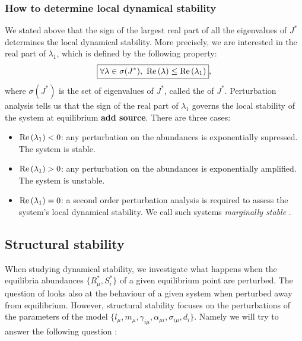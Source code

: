 \documentclass[12pt, titlepage]{report}
\begin{document}
\subsubsection{How to determine local dynamical stability}
We stated above that the sign of the largest real part of all the eigenvalues of $J^*$ determines the local dynamical stability.
More precisely, we are interested in the real part of $\lambda_1$, which is defined by the following property:
\begin{equation}
\boxed{\forall \lambda \in \sigma(J^*), \ \real{\lambda} \leq \real{\lambda_1}},
\end{equation}
where $\sigma(J^*)$ is the set of eigenvalues of $J^*$, called the  of $J^*$. Perturbation analysis tells us that the sign of the real part of $\lambda_1$ governs the local stability of the system at equilibrium \textbf{add source}. There are three cases:
\begin{itemize}
\item $\text{Re}\left(\lambda_1\right) < 0$: any perturbation on the abundances is exponentially supressed. The system is stable.
\item $\text{Re}\left(\lambda_1\right) > 0$: any perturbation on the abundances is exponentially amplified. The system is unstable.
\item $\text{Re}\left(\lambda_1\right)=0$: a second order perturbation analysis is required to assess the system's local dynamical stability. We call such systems \textit{marginally stable} \cite{biroli_marginally_2018}.
\end{itemize}

\subsection{Structural stability}
When studying dynamical stability, we investigate what happens when the equilibria abundances $\{R^*_\mu, S^*_i\}$ of a given equilibrium point are perturbed. The question of  looks also at the behaviour of a given system when perturbed away from equilibrium. However, structural stability focuses on the perturbations of the parameters of the model \ie  $\{l_\mu, m_\mu, \gamma_{i\mu}, \alpha_{\mu i}, \sigma_{i\mu},d_i\}$. Namely we will try to answer the following question :

\begin{centering}
\end{centering}
\end{document}
